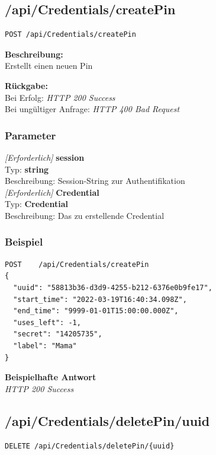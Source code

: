 \subsection{/api/Credentials/createPin}
\begin{lstlisting}
POST /api/Credentials/createPin
\end{lstlisting}

\textbf{Beschreibung:} \\
Erstellt einen neuen Pin

\textbf{Rückgabe:} \\
Bei Erfolg: \textit{HTTP 200 Success} \\
Bei ungültiger Anfrage: \textit{HTTP 400 Bad Request}

\subsubsection{Parameter}
\textit{[Erforderlich]} \textbf{session} \\
Typ: \textbf{string} \\
Beschreibung: Session-String zur Authentifikation \\


\textit{[Erforderlich]} \textbf{Credential} \\
Typ: \textbf{Credential} \\
Beschreibung: Das zu erstellende Credential \\


\subsubsection{Beispiel}
\begin{lstlisting}
POST    /api/Credentials/createPin
{
  "uuid": "58813b36-d3d9-4255-b212-6376e0b9fe17",
  "start_time": "2022-03-19T16:40:34.098Z",
  "end_time": "9999-01-01T15:00:00.000Z",
  "uses_left": -1,
  "secret": "14205735",
  "label": "Mama"
}
\end{lstlisting}
\textbf{Beispielhafte Antwort} \\
\textit{HTTP 200 Success}




\subsection{/api/Credentials/deletePin/{uuid}}
\begin{lstlisting}
DELETE /api/Credentials/deletePin/{uuid}
\end{lstlisting}

